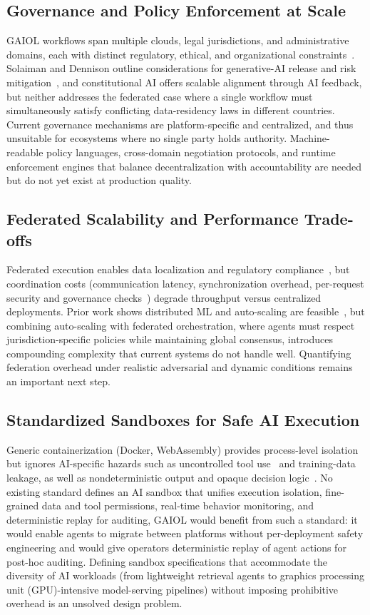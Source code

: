\documentclass{iopjournal}
\begin{document}
\subsection{Governance and Policy Enforcement at Scale}

GAIOL workflows span multiple clouds, legal jurisdictions, and administrative domains, each with distinct regulatory, ethical, and organizational constraints~\cite{FM_Governance, FedLearn}. Solaiman and Dennison outline considerations for generative-AI release and risk mitigation~\cite{SafetyTaxonomy_FAccT23}, and constitutional AI offers scalable alignment through AI feedback, but neither addresses the federated case where a single workflow must simultaneously satisfy conflicting data-residency laws in different countries. Current governance mechanisms are platform-specific and centralized, and thus unsuitable for ecosystems where no single party holds authority. Machine-readable policy languages, cross-domain negotiation protocols, and runtime enforcement engines that balance decentralization with accountability are needed but do not yet exist at production quality.

\subsection{Federated Scalability and Performance Trade-offs}

Federated execution enables data localization and regulatory compliance~\cite{FedLearn}, but coordination costs (communication latency, synchronization overhead, per-request security and governance checks~\cite{NISTZTA}) degrade throughput versus centralized deployments. Prior work shows distributed ML and auto-scaling are feasible~\cite{FedML_MLSys22, Autoscaling_MAS}, but combining auto-scaling with federated orchestration, where agents must respect jurisdiction-specific policies while maintaining global consensus, introduces compounding complexity that current systems do not handle well. Quantifying federation overhead under realistic adversarial and dynamic conditions remains an important next step.

\subsection{Standardized Sandboxes for Safe AI Execution}
Generic containerization (Docker, WebAssembly) provides process-level isolation but ignores AI-specific hazards such as uncontrolled tool use~\cite{Toolformer} and training-data leakage, as well as nondeterministic output and opaque decision logic~\cite{Weidinger}. No existing standard defines an AI sandbox that unifies execution isolation, fine-grained data and tool permissions, real-time behavior monitoring, and deterministic replay for auditing, GAIOL would benefit from such a standard: it would enable agents to migrate between platforms without per-deployment safety engineering and would give operators deterministic replay of agent actions for post-hoc auditing. Defining sandbox specifications that accommodate the diversity of AI workloads (from lightweight retrieval agents to graphics processing unit (GPU)-intensive model-serving pipelines) without imposing prohibitive overhead is an unsolved design problem.
\end{document}

